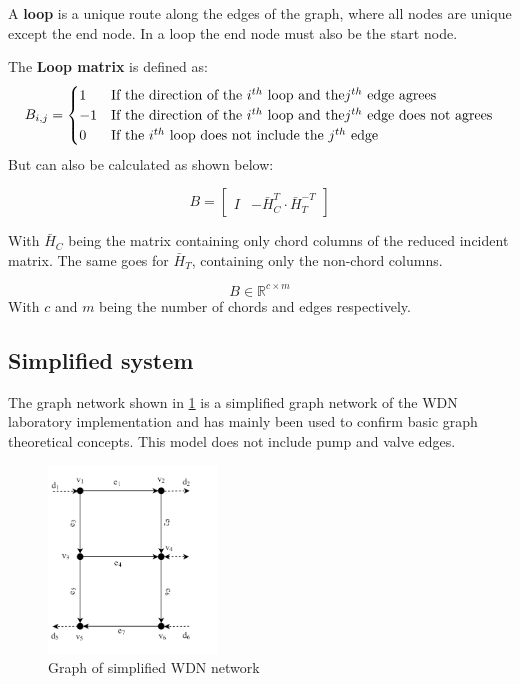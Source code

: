 A \textbf{loop} is a unique route along the edges of the graph, where all nodes are unique except the end node.  In a loop the end node must also be the start node. 

The \textbf{Loop matrix} is defined as:
\begin{equation*}
	B_{i,j} = \begin{cases}
		1 & \text{If the direction of the $ i^{th} $ loop and the} \text{$j^{th}$ edge agrees}\\
		-1 & \text{If the direction of the $ i^{th} $ loop and the} \text{$j^{th}$ edge does not agrees}\\
		0 & \text{If the $ i^{th} $ loop does not include the $ j^{th} $ edge}\\
	\end{cases}
\end{equation*}
But can also be calculated as shown below:

\begin{equation}\label{eq:LoopMatrix}
	B = \begin{bmatrix}
		I & -\bar{H}_{C}^{T}\cdot\bar{H}_{T}^{-T}
	\end{bmatrix}
\end{equation}

With $\bar{H}_{C}$ being the matrix containing only chord columns of the reduced incident matrix. The same goes for  $\bar{H}_{T}$, containing only the non-chord columns. 

\begin{equation*}
	B\in \mathbb{R}^{c\times m}
\end{equation*}
With $c$ and $m$ being the number of chords and edges respectively.

\newpage
\subsection{Simplified system}
The graph network shown in \cref{fig:graph} is a simplified graph network of the WDN laboratory implementation and has mainly been used to confirm basic graph theoretical concepts. This model does not include pump and valve edges.  
\begin{figure}[h!]
	\centering
	\includegraphics[width=0.4\textwidth]{Pictures/Graph.png}
	\caption{Graph of simplified WDN network \cite{Rathore930}}
	\label{fig:graph}
\end{figure}

